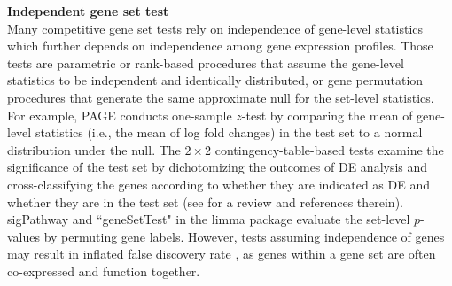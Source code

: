 \documentclass[a4,center,fleqn]{NAR}
\newcommand{\gen}{geneSetTest}
\begin{document}
	\textbf{Independent gene set test} \\
	Many competitive gene set tests rely on independence of gene-level statistics which further depends
	on independence among gene expression profiles. Those tests are parametric or rank-based procedures
	that assume the gene-level statistics to be independent and identically distributed, or gene
	permutation procedures that generate the same approximate null for the set-level statistics. For
	example, PAGE  \citep{kim2005page} conducts one-sample $z$-test by comparing the mean of gene-level
	statistics (i.e., the mean of log fold changes) in the test set to a normal distribution under the
	null. The $2\times 2$ contingency-table-based tests examine the significance of the test set by
	dichotomizing the outcomes of DE analysis and cross-classifying the genes according to whether they
	are indicated as DE and whether they are in the test set (see \cite{huang2009bioinformatics} for a
	review and references therein). sigPathway \citep{tian2005discovering} and ``\gen" in the limma
	package \citep{Smyth2004moderated} evaluate the set-level $p$-values by permuting gene labels.
	However, tests assuming independence of genes may result in inflated false discovery rate
	\citep{efron2007testing,goeman2007analyzing, gatti2010heading,wu2012camera,yaari2013quantitative},
	as genes within a gene set are often co-expressed and function together.
	
\end{document}
